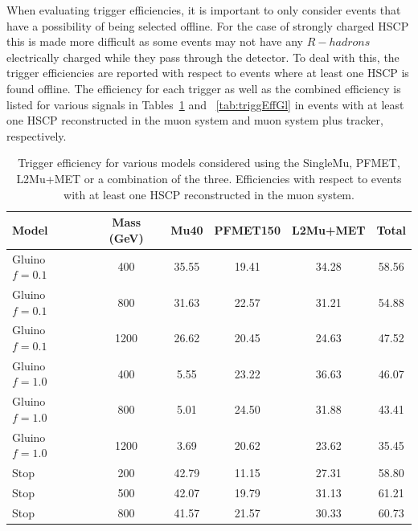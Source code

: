 When evaluating trigger efficiencies, it is important to only consider events that have a possibility of being selected offline.
For the case of strongly charged HSCP this is made more difficult as some events may not have any $R-hadrons$ electrically charged while they pass through the detector.
To deal with this, the trigger efficiencies are reported with respect to events where at least one HSCP is found offline.
The efficiency for each trigger as well as the combined efficiency is listed for various signals in Tables~\ref{tab:triggEffSA} and ~\ref{tab:triggEffGl} in events
with at least one HSCP reconstructed in the muon system and muon system plus tracker, respectively.

\begin{table}
 \begin{center}
  \caption[Trigger efficiency for various models considered with respect to events with a reconstructed HSCP in the muon system]
{Trigger efficiency for various models considered using the SingleMu, PFMET, L2Mu+MET or a combination of the three.
Efficiencies with respect to events with at least one HSCP reconstructed in the muon system.}
     \label{tab:triggEffSA}
  \begin{tabular}{|l|c|c|c|c|c|} \hline
      Model     & Mass (GeV) & Mu40       & PFMET150   &  L2Mu+MET  & Total                 \\ \hline
 Gluino $f=0.1$ &  400  & 35.55      & 19.41      & 34.28      & 58.56    \\
 Gluino $f=0.1$ &  800  & 31.63      & 22.57      & 31.21      & 54.88    \\
 Gluino $f=0.1$ & 1200  & 26.62      & 20.45      & 24.63      & 47.52    \\
 Gluino $f=1.0$ &  400  &  5.55      & 23.22      & 36.63      & 46.07    \\
 Gluino $f=1.0$ &  800  &  5.01      & 24.50      & 31.88      & 43.41    \\
 Gluino $f=1.0$ & 1200  &  3.69      & 20.62      & 23.62      & 35.45    \\
           Stop &  200  & 42.79      & 11.15      & 27.31      & 58.80    \\
           Stop &  500  & 42.07      & 19.79      & 31.13      & 61.21    \\
           Stop &  800  & 41.57      & 21.57      & 30.33      & 60.73    \\ \hline
  \end{tabular}
 \end{center}
\end{table}

